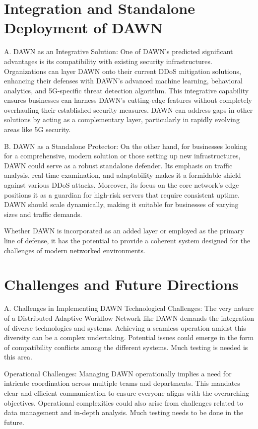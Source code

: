 \documentclass[conference]{IEEEtran}
\begin{document}
\section{Integration and Standalone Deployment of DAWN}
A. DAWN as an Integrative Solution: 
One of DAWN's predicted significant advantages is its compatibility with existing security infrastructures. Organizations can layer DAWN onto their current DDoS mitigation solutions, enhancing their defenses with DAWN's advanced machine learning, behavioral analytics, and 5G-specific threat detection algorithm. This integrative capability ensures businesses can harness DAWN's cutting-edge features without completely overhauling their established security measures. DAWN can address gaps in other solutions by acting as a complementary layer, particularly in rapidly evolving areas like 5G security.

B. DAWN as a Standalone Protector: 
On the other hand, for businesses looking for a comprehensive, modern solution or those setting up new infrastructures, DAWN could serve as a robust standalone defender. Its emphasis on traffic analysis, real-time examination, and adaptability makes it a formidable shield against various DDoS attacks. Moreover, its focus on the core network's edge positions it as a guardian for high-risk servers that require consistent uptime. DAWN should scale dynamically, making it suitable for businesses of varying sizes and traffic demands.

Whether DAWN is incorporated as an added layer or employed as the primary line of defense, it has the potential to provide a coherent system designed for the challenges of modern networked environments.

\section{Challenges and Future Directions}
A. Challenges in Implementing DAWN
Technological Challenges:
The very nature of a Distributed Adaptive Workflow Network like DAWN demands the integration of diverse technologies and systems. Achieving a seamless operation amidst this diversity can be a complex undertaking. Potential issues could emerge in the form of compatibility conflicts among the different systems. Much testing is needed is this area. 

Operational Challenges: 
Managing DAWN operationally implies a need for intricate coordination across multiple teams and departments. This mandates clear and efficient communication to ensure everyone aligns with the overarching objectives. Operational complexities could also arise from challenges related to data management and in-depth analysis. Much testing needs to be done in the future. 
\end{document}
